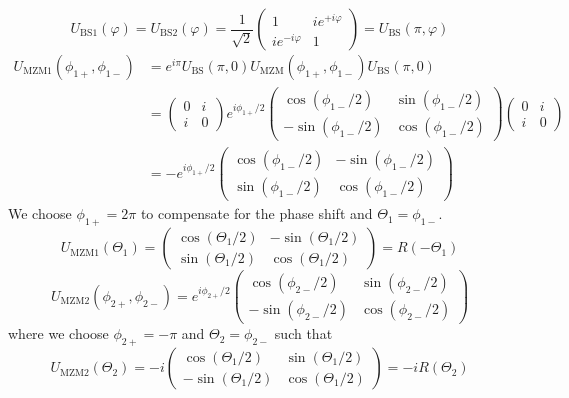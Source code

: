 \begin{equation}
	U_\text{BS1}(\varphi)
	=
	U_\text{BS2}(\varphi)
	=
	\frac{1}{\sqrt{2}}
	\begin{pmatrix}
		1 & ie^{+i\varphi} \\
		ie^{-i\varphi} & 1
	\end{pmatrix}
	=
	U_\text{BS}(\pi,\varphi)
\end{equation}
\begin{equation}
	\begin{split}
		U_\text{MZM1}(\phi_{1+},\phi_{1-})
		&=
		e^{i\pi}
		U_\text{BS}(\pi,0)
		U_\text{MZM}(\phi_{1+},\phi_{1-})
		U_\text{BS}(\pi,0)
		\\
		&=
		\begin{pmatrix}
			0 & i \\
			i & 0
		\end{pmatrix}
		e^{i\phi_{1+}/2}
		\begin{pmatrix}
			\cos(\phi_{1-}/2) & \sin(\phi_{1-}/2) \\
			-\sin(\phi_{1-}/2) & \cos(\phi_{1-}/2)
		\end{pmatrix}
		\begin{pmatrix}
			0 & i \\
			i & 0
		\end{pmatrix}
		\\
		&=
		-
		e^{i\phi_{1+}/2}
		\begin{pmatrix}
			\cos(\phi_{1-}/2) & -\sin(\phi_{1-}/2) \\
			\sin(\phi_{1-}/2) & \cos(\phi_{1-}/2)
		\end{pmatrix}
	\end{split}
\end{equation}
We choose $\phi_{1+}=2\pi$ to compensate for the phase shift and $\Theta_1=\phi_{1-}$.
\begin{equation}
	U_\text{MZM1}(\Theta_1)
	=
	\begin{pmatrix}
		\cos(\Theta_1/2) & -\sin(\Theta_1/2) \\
		\sin(\Theta_1/2) & \cos(\Theta_1/2)
	\end{pmatrix}
	=
	R(-\Theta_1)
\end{equation}
\begin{equation}
	U_\text{MZM2}(\phi_{2+},\phi_{2-})
	=
	e^{i\phi_{2+}/2}
	\begin{pmatrix}
		\cos(\phi_{2-}/2) & \sin(\phi_{2-}/2) \\
		-\sin(\phi_{2-}/2) & \cos(\phi_{2-}/2)
	\end{pmatrix}
\end{equation}
where we choose $\phi_{2+}=-\pi$ and $\Theta_2=\phi_{2-}$ such that
\begin{equation}
	U_\text{MZM2}(\Theta_2)
	=
	-i
	\begin{pmatrix}
		\cos(\Theta_1/2) & \sin(\Theta_1/2) \\
		-\sin(\Theta_1/2) & \cos(\Theta_1/2)
	\end{pmatrix}
	=
	-i
	R(\Theta_2)
\end{equation}

